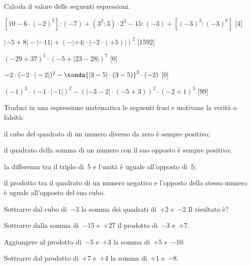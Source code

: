 \begin{esercizio} %
Calcola il valore delle seguenti espressioni.
 \begin{enumeratea}
 \item \([10-6\cdot(-2)^2]:(-7)+(3^2:3)\cdot2^3-15:(-3)+[(-3)^3:(-3)^0]\)
  \hfill[4]
 \item \(|-5+8|-|-11|+(-|+4|\cdot|-2\cdot(+5)|)^2\) \hfill[1592]
 \item \((-29+37)^5\cdot(-5+|23-28|)^7\) \hfill[0]
 \item \(-2\cdot(-2\cdot|-2|)^2-\tonda{|3-5|\cdot(3-5) }^2\cdot(-2)\)
  \hfill[0]
 \item \((-1)^3\cdot(-1\cdot|-1|)^2-(|-3-2|\cdot(-5+3))^2\cdot(-2+1)^3\)
  \hfill[99]
 \end{enumeratea}
\end{esercizio}
\begin{multicols}{2}
\begin{esercizio}
Traduci in una espressione matematica le seguenti frasi e motivane la verità o 
falsità:
 \begin{enumeratea}
 \item il cubo del quadrato di un numero diverso da zero è sempre positivo;
 \item il quadrato della somma di un numero con il suo opposto è sempre 
positivo;
 \item la differenza tra il triplo di~5 e l'unità è uguale all'opposto di~5;
 \item il prodotto tra il quadrato di un numero negativo e l'opposto dello 
stesso numero 
è uguale all'opposto del suo cubo.
 \end{enumeratea}
\end{esercizio}

\begin{esercizio}
 Sottrarre dal cubo di~\(-3\) la somma dei quadrati di~\(+\)2 e~\(-2\) Il risultato è?
\end{esercizio}

\begin{esercizio}
 Sottrarre dalla somma di~\(-\)15 e~\(+\)27 il prodotto di~\(-\)3 e~\(+\)7.
\end{esercizio}

\begin{esercizio}
 Aggiungere al prodotto di~\(-\)5 e~\(+\)3 la somma di~\(+\)5 e~\(-\)10.
\end{esercizio}

\begin{esercizio}
 Sottrarre dal prodotto di~\(+\)7 e~\(+\)4 la somma di~\(+\)1 e~\(-\)8.
\end{esercizio}


\end{multicols}
